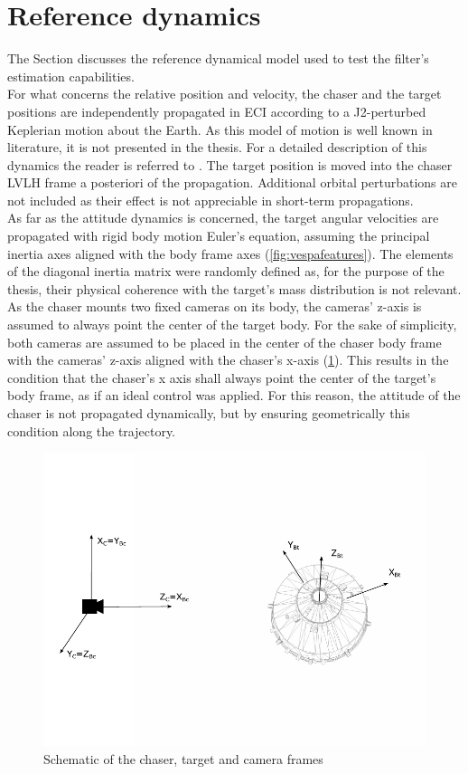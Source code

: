 \section{Reference dynamics}
\label{sec:errors}
The Section discusses the reference dynamical model used to test the filter's estimation capabilities. \\
For what concerns the relative position and velocity, the chaser and the target positions are independently propagated in ECI according to a J2-perturbed Keplerian motion about the Earth. As this model of motion is well known in literature, it is not presented in the thesis. For a detailed description of this dynamics the reader is referred to \cite{alfriend2009spacecraft}. The target position is moved into the chaser LVLH frame a posteriori of the propagation. Additional orbital perturbations are not included as their effect is not appreciable in short-term propagations. \\
As far as the attitude dynamics is concerned, the target angular velocities are propagated with rigid body motion Euler's equation, assuming the principal inertia axes aligned with the body frame axes (\cref{fig:vespafeatures}). The elements of the diagonal inertia matrix were randomly defined as, for the purpose of the thesis, their physical coherence with the target's mass distribution is not relevant. As the chaser mounts two fixed cameras on its body, the cameras' z-axis is assumed to always point the center of the target body. For the sake of simplicity, both cameras are assumed to be placed in the center of the chaser body frame with the cameras' z-axis aligned with the chaser's x-axis (\cref{fig:relframes}). This results in the condition that the chaser's x axis shall always point the center of the target's body frame, as if an ideal control was applied. For this reason, the attitude of the chaser is not propagated dynamically, but by ensuring geometrically this condition along the trajectory. 
\begin{figure}[!h]
    \centering
    \includegraphics[clip, trim = 0cm 3cm 0cm 3cm, width = 0.7\linewidth]{Images/relframes.pdf}
    \caption{Schematic of the chaser, target and camera frames}
    \label{fig:relframes}
\end{figure}


